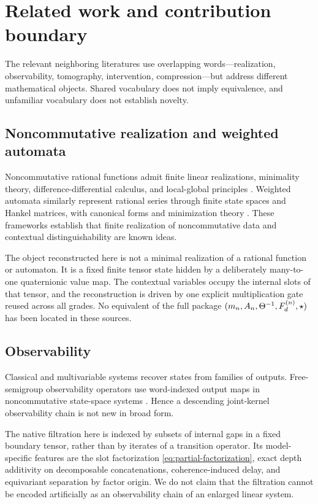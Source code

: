 \section{Related work and contribution boundary}\label{sec:related}

The relevant neighboring literatures use overlapping words---realization, observability, tomography, intervention, compression---but address different mathematical objects.  Shared vocabulary does not imply equivalence, and unfamiliar vocabulary does not establish novelty.

\subsection{Noncommutative realization and weighted automata}

Noncommutative rational functions admit finite linear realizations, minimality theory, difference-differential calculus, and local-global principles \cite{kaliuzhnyi2010,volcic2015}.  Weighted automata similarly represent rational series through finite state spaces and Hankel matrices, with canonical forms and minimization theory \cite{balle2015}.  These frameworks establish that finite realization of noncommutative data and contextual distinguishability are known ideas.

The object reconstructed here is not a minimal realization of a rational function or automaton.  It is a fixed finite tensor state hidden by a deliberately many-to-one quaternionic value map.  The contextual variables occupy the internal slots of that tensor, and the reconstruction is driven by one explicit multiplication gate reused across all grades.  No equivalent of the full package $(m_n,A_n,\Theta^{-1},F_d^{(n)},\star)$ has been located in these sources.

\subsection{Observability}

Classical and multivariable systems recover states from families of outputs.  Free-semigroup observability operators use word-indexed output maps in noncommutative state-space systems \cite{ball2006}.  Hence a descending joint-kernel observability chain is not new in broad form.

The native filtration here is indexed by subsets of internal gaps in a fixed boundary tensor, rather than by iterates of a transition operator.  Its model-specific features are the slot factorization \eqref{eq:partial-factorization}, exact depth additivity on decomposable concatenations, coherence-induced delay, and equivariant separation by factor origin.  We do not claim that the filtration cannot be encoded artificially as an observability chain of an enlarged linear system.

